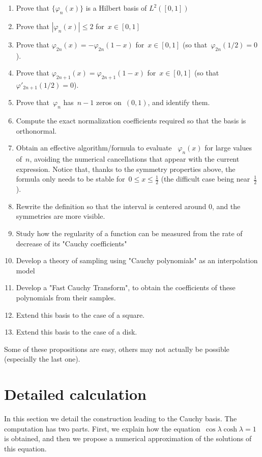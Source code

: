 \begin{enumerate}
	\item Prove that $\{\varphi_n(x)\}$ is a Hilbert basis of $L^2([0,1])$
	\item Prove that $|\varphi_n(x)|\le 2$ for~$x\in[0,1]$
	\item Prove that $\varphi_{2n}(x)=-\varphi_{2n}(1-x)$ for~$x\in[0,1]$
		(so that~$\varphi_{2n}(1/2)=0$).
	\item Prove that $\varphi_{2n+1}(x)=\varphi_{2n+1}(1-x)$ for~$x\in[0,1]$
		(so that~$\varphi'_{2n+1}(1/2)=0$).
	\item Prove that~$\varphi_n$ has~$n-1$ zeros on~$(0,1)$, and identify
		them.
	\item Compute the exact normalization coefficients required so that the
		basis is orthonormal.
	\item Obtain an effective algorithm/formula to evaluate
		~$\varphi_n(x)$ for large values of~$n$, avoiding the
		numerical cancellations that appear with the current
		expression.  Notice that, thanks to the symmetry properties
		above, the formula only needs to be stable for~$0\le
		x\le\frac{1}{2}$ (the difficult case being
		near~$\frac{1}{2}$).
	\item Rewrite the definition so that the interval is centered around
		0, and the symmetries are more visible.
	\item Study how the regularity of a function can be measured from the
		rate of decrease of its "Cauchy coefficients"
	\item Develop a theory of sampling using "Cauchy polynomials" as an
		interpolation model
	\item Develop a "Fast Cauchy Transform", to obtain the coefficients
		of these polynomials from their samples.
	\item Extend this basis to the case of a square.
	\item Extend this basis to the case of a disk.
\end{enumerate}

Some of these propositions are easy, others may not actually be possible
(especially the last one).

\section{Detailed calculation}

In this section we detail the construction leading to the Cauchy basis.
The computation has two parts.  First, we explain how the
equation~$\cos\lambda\cosh\lambda=1$ is obtained,
and then we propose a numerical approximation of the solutions of this
equation.


